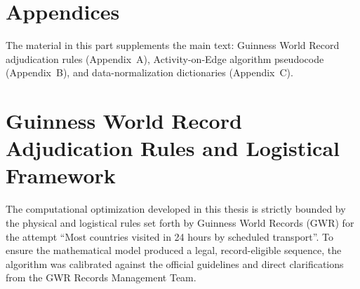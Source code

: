 \clearpage
\thispagestyle{empty}
\null
\clearpage

\appendix

\chapter*{Appendices}

The material in this part supplements the main text: Guinness World Record adjudication rules (Appendix~A), Activity-on-Edge algorithm pseudocode (Appendix~B), and data-normalization dictionaries (Appendix~C).

\cleardoublepage

\chapter{Guinness World Record Adjudication Rules and Logistical Framework}
\label{sec:appendix-a-gwr}

The computational optimization developed in this thesis is strictly bounded by the physical and logistical rules set forth by Guinness World Records (GWR) for the attempt ``Most countries visited in 24 hours by scheduled transport''. To ensure the mathematical model produced a legal, record-eligible sequence, the algorithm was calibrated against the official guidelines and direct clarifications from the GWR Records Management Team.

